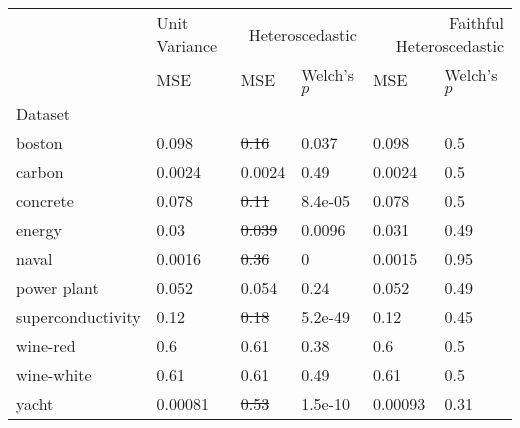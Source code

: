 \begin{tabular}{l|l|ll|ll}
\toprule
 & Unit Variance & \multicolumn{2}{r}{Heteroscedastic} & \multicolumn{2}{r}{Faithful Heteroscedastic} \\
 & MSE & MSE & Welch's $p$ & MSE & Welch's $p$ \\
Dataset &  &  &  &  &  \\
\midrule
boston & 0.098 & \sout{0.16} & 0.037 & 0.098 & 0.5 \\
carbon & 0.0024 & 0.0024 & 0.49 & 0.0024 & 0.5 \\
concrete & 0.078 & \sout{0.11} & 8.4e-05 & 0.078 & 0.5 \\
energy & 0.03 & \sout{0.039} & 0.0096 & 0.031 & 0.49 \\
naval & 0.0016 & \sout{0.36} & 0 & 0.0015 & 0.95 \\
power plant & 0.052 & 0.054 & 0.24 & 0.052 & 0.49 \\
superconductivity & 0.12 & \sout{0.18} & 5.2e-49 & 0.12 & 0.45 \\
wine-red & 0.6 & 0.61 & 0.38 & 0.6 & 0.5 \\
wine-white & 0.61 & 0.61 & 0.49 & 0.61 & 0.5 \\
yacht & 0.00081 & \sout{0.53} & 1.5e-10 & 0.00093 & 0.31 \\
\bottomrule
\end{tabular}
